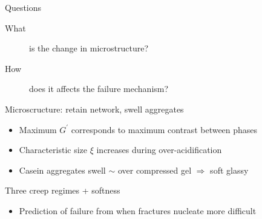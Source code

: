 \documentclass[xcolor=table]{beamer}
\begin{document}
\begin{frame}{Questions}
\begin{description}
\item[What] is the change in microstructure?
\item[How] does it affects the failure mechanism?
\end{description}
\end{frame}

\begin{frame}{Microscructure: retain network, swell aggregates}
	
	\begin{itemize}
	\item Maximum $G^\prime$ corresponds to maximum contrast between phases
	\item Characteristic size $\xi$ increases during over-acidification
	\item Casein aggregates swell $\sim$ over compressed gel $\Rightarrow$ soft glassy
	\end{itemize}
\end{frame}

\begin{frame}{Three creep regimes + softness}
\vfill
	
\begin{itemize}
\item Prediction of failure from when fractures nucleate more difficult
\end{itemize}

\end{frame}


\begin{frame}[plain]
	\titlepage
\end{frame}
\end{document}
